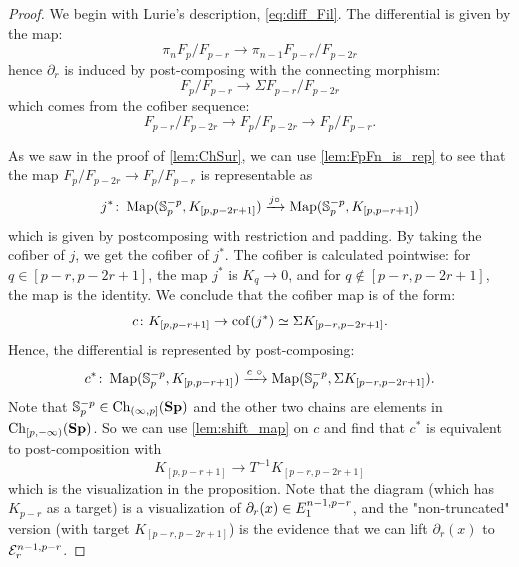 \begin{proof}
    We begin with Lurie's description, \cref{eq:diff_Fil}. The differential is given by the map:
    \begin{equation}
        \pi_n F_p/F_{p-r} \to \pi_{n-1} F_{p-r}/F_{p-2r}
    \end{equation}
    hence $\partial_r$ is induced by post-composing with the connecting morphism:
    \begin{equation*}
        F_p/F_{p-r} \to \Sigma F_{p-r}/F_{p-2r}
    \end{equation*}
    which comes from the cofiber sequence:
    \begin{equation*}
        F_{p-r}/F_{p-2r} \to F_p/F_{p-2r} \to F_p/F_{p-r}.
    \end{equation*}

    As we saw in the proof of \cref{lem:ChSur}, we can use \cref{lem:FpFn_is_rep} to see that the map $F_p/F_{p-2r} \to F_p/F_{p-r}$ is representable as
    \begin{equation*}
        j^* \colon \operatorname{Map}(\mathbb{S}^{-p}_p, K_{[p,p-2r+1]}) \xrightarrow{j \circ } \operatorname{Map}(\mathbb{S}^{-p}_p, K_{[p,p-r+1]})
    \end{equation*}
    which is given by postcomposing with restriction and padding. By taking the cofiber of $j$, we get the cofiber of $j^*$. The cofiber is calculated pointwise: for $q \in [p-r,p-2r+1]$, the map $j^*$ is $K_q \to 0$, and for $q \notin [p-r,p-2r+1]$, the map is the identity. We conclude that the cofiber map is of the form:
    \begin{equation*}
        c \colon K_{[p,p-r+1]} \to \operatorname{cof}(j^*) \simeq \Sigma K_{[p-r,p-2r+1]}.
    \end{equation*}
    Hence, the differential is represented by post-composing:
    \begin{equation*}
        c^* \colon \operatorname{Map}(\mathbb{S}^{-p}_p, K_{[p,p-r+1]}) \xrightarrow{c \ \circ } \operatorname{Map}(\mathbb{S}^{-p}_p, \Sigma K_{[p-r,p-2r+1]}).
    \end{equation*}
    Note that $\mathbb{S}^{-p}_p \in \operatorname{Ch}_{(\infty,p]}(\mathbf{Sp})$ and the other two chains are elements in $\operatorname{Ch}_{[p,-\infty)}(\mathbf{Sp})$. So we can use \cref{lem:shift_map} on $c$ and find that $c^*$ is equivalent to post-composition with
    \begin{equation*}
        K_{[p,p-r+1]} \to T^{-1} K_{[p-r,p-2r+1]}
    \end{equation*}
    which is the visualization in the proposition.
    Note that the diagram (which has $K_{p-r}$ as a target) is a visualization of $\partial_r(x) \in E_{1}^{n-1,p-r}$, and the "non-truncated" version (with target $K_{[p-r,p-2r+1]}$) is the evidence that we can lift $\partial_r(x)$ to $\mathcal{E}_{r}^{n-1,p-r}$.


\end{proof}
